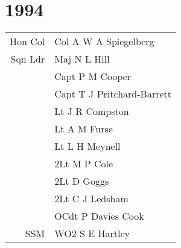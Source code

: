 \chapter*{1994}

\begin{center}
  \begin{tabular}{rl}
    Hon Col & Col A W A Spiegelberg \\
    Sqn Ldr & Maj N L Hill \\
    & Capt P M Cooper \\
    & Capt T J Pritchard-Barrett \\
    & Lt J R Compston \\
    & Lt A M Furse \\
    & Lt L H Meynell \\
    & 2Lt M P Cole \\
    & 2Lt D Goggs \\
    & 2Lt C J Ledsham \\
    & OCdt P Davies Cook \\
    SSM & WO2 S E Hartley \\
  \end{tabular}
\end{center}

